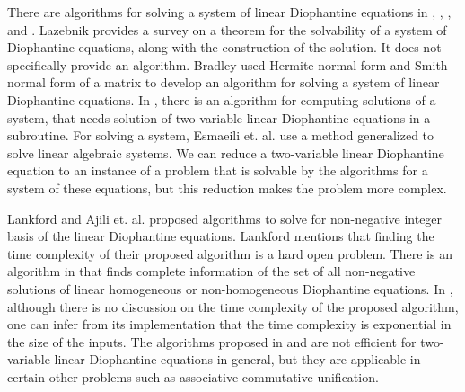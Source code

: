 \documentclass[pdflatex,sn-mathphys-num]{sn-jnl}%
\theoremstyle{thmstyleone}%
\theoremstyle{thmstyletwo}%
\theoremstyle{thmstylethree}%
\begin{document}
 \par There are algorithms for solving a system of linear Diophantine equations in \cite{chou1982algorithms},  \cite{lazebnik1996systems}, \cite{bradley1971algorithms}, and \cite{esmaeili2001class}. Lazebnik \cite{lazebnik1996systems} provides a survey on a theorem for the solvability of a system of Diophantine equations, along with the construction of the solution. It does not specifically provide an algorithm. Bradley \cite{bradley1971algorithms} used Hermite normal form and Smith normal form of a matrix to develop an algorithm for solving a system of linear Diophantine equations. In \cite{chou1982algorithms}, there is an algorithm for computing solutions of a system, that needs solution of two-variable linear Diophantine equations in a subroutine.  For solving a system, Esmaeili et. al.  \cite{esmaeili2001class} use a method generalized to solve linear algebraic systems. We can reduce a two-variable linear Diophantine equation to an instance of a problem that is solvable by the algorithms for a system of these equations, but this reduction makes the problem more complex. 

 \par Lankford \cite{lankford1989non} and  Ajili et. al. \cite{ajili1995complete} proposed algorithms to solve for non-negative integer basis of the linear Diophantine equations.  Lankford \cite{lankford1989non} mentions that finding the time complexity of their proposed algorithm is a hard open problem. There is an algorithm in \cite{clausen1989efficient} that finds complete information of the set of all non-negative solutions of linear homogeneous or non-homogeneous Diophantine equations. In \cite{clausen1989efficient}, although there is no discussion on  the time complexity of the proposed algorithm, one can infer from its implementation that the time complexity is exponential in the size of the inputs. The algorithms proposed in \cite{clausen1989efficient}  and \cite{lankford1989non}  are not efficient for two-variable linear Diophantine equations in general, but they are applicable in certain other problems such as associative commutative unification. 
\end{document}
